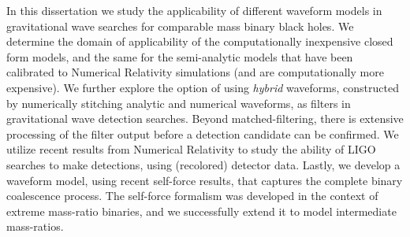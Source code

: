 
In this dissertation we study the applicability of different waveform models 
in gravitational wave searches for comparable mass binary black holes.
We determine the domain of applicability of the computationally inexpensive closed 
form models, and the same for the semi-analytic models that have been calibrated
to Numerical Relativity simulations (and are computationally more expensive).
We further explore the option of using {\it hybrid} waveforms, constructed 
by numerically stitching analytic and numerical waveforms, as filters in
gravitational wave detection searches. Beyond matched-filtering, there 
is extensive processing of the filter output before a detection candidate can
be confirmed. We utilize recent results from Numerical Relativity to study
the ability of LIGO searches to make detections, using (recolored) detector data.
Lastly, we develop a waveform model, using recent self-force results, that 
captures the complete binary coalescence process. The self-force formalism was
developed in the context of extreme mass-ratio binaries, and we successfully
extend it to model intermediate mass-ratios.
